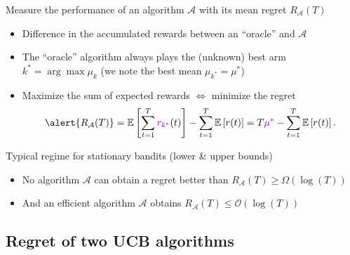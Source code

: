 \documentclass[11pt,english,ignorenonframetext,]{beamer}
\begin{document}
\begin{frame}{Measure the performance of an algorithm $\mathcal{A}$ with its mean regret $R_{\mathcal{A}}(T)$}

\begin{itemize}
  \item
  Difference in the accumulated rewards between an ``oracle'' and $\mathcal{A}$

  \item
  The ``oracle'' algorithm always plays \textcolor{deeppurple}{the (unknown) best arm $k^* = \arg\max \mu_k$} (we note the best mean \textcolor{deeppurple}{$\mu_{k^*} = \mu^*$})

  \item
  Maximize the sum of expected rewards
  $\Longleftrightarrow$ \alert{minimize the regret}
  \[ \alert{ R_{\mathcal{A}}(T) } = \mathbb{E}\left[ \sum\limits_{t=1}^T \textcolor{deeppurple}{r_{k^*}}(t) \right] - \sum\limits_{t=1}^T \mathbb{E}\left[ r(t) \right] = T \textcolor{deeppurple}{\mu^*} - \sum\limits_{t=1}^T \mathbb{E}\left[ r(t) \right]. \]

\end{itemize}

\pause
\vspace*{10pt}

\begin{exampleblock}{Typical regime for stationary bandits (lower \& upper bounds)}
  \begin{itemize}
  \item
  No algorithm $\mathcal{A}$ can obtain a regret better than
  \hfill{}
  $R_{\mathcal{A}}(T) \geq \Omega(\log(T))$

  \item
  And an efficient algorithm $\mathcal{A}$ obtains
  \hfill{}
  $R_{\mathcal{A}}(T) \leq \mathcal{O}(\log(T))$
  \end{itemize}
\end{exampleblock}

\end{frame}

\subsection{\hfill{}Regret of two UCB algorithms\hfill{}}
\end{document}
